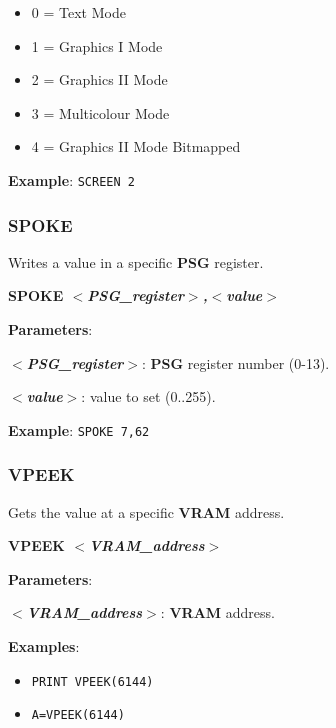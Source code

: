         \begin{itemize}
            \item 0 = Text Mode
            \item 1 = Graphics I Mode
            \item 2 = Graphics II Mode
            \item 3 = Multicolour Mode
            \item 4 = Graphics II Mode Bitmapped
        \end{itemize}

        \textbf{Example}: \texttt{SCREEN 2}

        \subsubsection{{SPOKE}}
        Writes a value in a specific \textbf{PSG} register.

        \hspace{1.9cm}\textbf{SPOKE \textit{$<$PSG\_register$>$,$<$value$>$}}

        \textbf{Parameters}:

        \hspace{1cm}\textbf{\textit{$<$PSG\_register$>$}}: \textbf{PSG} register
        number (0-13).

        \hspace{1cm}\textbf{\textit{$<$value$>$}}: value to set (0..255).

        \textbf{Example}: \texttt{SPOKE 7,62}

        \subsubsection{{VPEEK}}
        Gets the value at a specific \textbf{VRAM} address.

        \hspace{1.9cm}\textbf{VPEEK \textit{$<$VRAM\_address$>$}}

        \textbf{Parameters}:

        \hspace{1cm}\textbf{\textit{$<$VRAM\_address$>$}}: \textbf{VRAM} address.

        \textbf{Examples}:
        \begin{itemize}
            \item \texttt{PRINT VPEEK(6144)}
            \item \texttt{A=VPEEK(6144)}
        \end{itemize}

